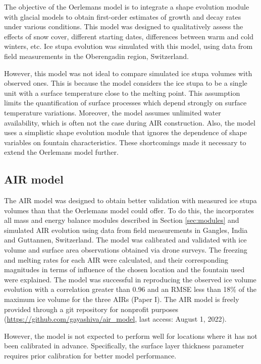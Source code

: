 The objective of the Oerlemans model is to integrate a shape evolution module with glacial models to obtain
first-order estimates of growth and decay rates under various conditions. This model was designed to
qualitatively assess the effects of snow cover, different starting dates, differences between warm and cold
winters, etc. Ice stupa evolution was simulated with this model, using data from field measurements in the Oberengadin region,
Switzerland. 

However, this model was not ideal to compare simulated ice stupa volumes with observed ones. This is
because the model considers the ice stupa to be a single unit with a surface temperature close to the melting
point. This assumption limits the quantification of surface processes which depend strongly on surface
temperature variations. Moreover, the model assumes unlimited water availability, which is often not the case
during AIR construction. Also, the model uses a simplistic shape evolution module that ignores the dependence of
shape variables on fountain characteristics. These shortcomings made it necessary to extend the Oerlemans
model further.

\subsection{AIR model}

The AIR model was designed to obtain better validation with measured ice stupa volumes than that the Oerlemans model could offer.
To do this, the incorporates all mass and energy balance modules described in Section
\ref{sec:modules} and simulated AIR evolution using data from field measurements in Gangles, India and
Guttannen, Switzerland. The model was calibrated and validated with ice volume and surface area observations
obtained via drone surveys. The freezing and melting rates for each \ac{AIR} were calculated, and
their corresponding magnitudes in terms of influence of the chosen location and the fountain used were explained.
The model was successful in reproducing the observed ice volume evolution with a correlation greater than 0.96
and an \ac{RMSE} less than 18\% of the maximum ice volume for the three AIRs (Paper I). The AIR model is freely
provided through a git repository for nonprofit purposes (\url{https://github.com/gayashiva/air_model}, last
access: August 1, 2022).

However, the model is not expected to perform well for locations where it has not been calibrated in advance.
Specifically, the surface layer thickness parameter requires prior calibration for better model performance.

